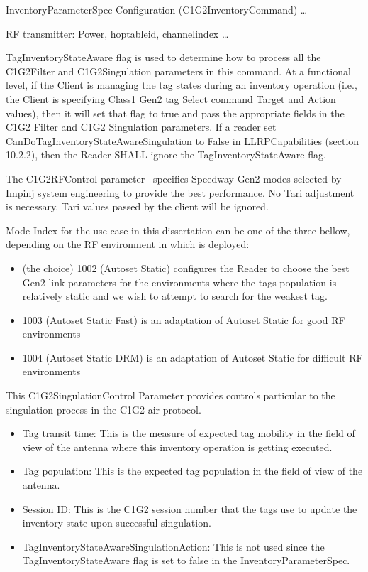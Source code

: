InventoryParameterSpec Configuration (C1G2InventoryCommand) \dots

RF transmitter: Power, hoptableid, channelindex \dots

TagInventoryStateAware flag is used to determine how to process all the C1G2Filter and C1G2Singulation parameters in this command. At a functional level, if the Client is managing the tag states during an inventory operation (i.e., the Client is specifying Class1 Gen2 tag Select command Target and Action values), then it will set that flag to true and pass the appropriate fields in the C1G2 Filter and C1G2 Singulation parameters. If a reader set CanDoTagInventoryStateAwareSingulation to False in LLRPCapabilities (section 10.2.2), then the Reader SHALL ignore the TagInventoryStateAware flag.

The C1G2RFControl parameter~\cite[sec. 3.1.4]{ImpinjOctaneLLRP} specifies Speedway Gen2 modes selected by Impinj system engineering to provide the best performance. No Tari adjustment is necessary. Tari values passed by the client will be ignored.

Mode Index for the use case in this dissertation can be one of the three bellow, depending on the RF environment in which is deployed: 

\begin{itemize}
    \item (the choice) 1002 (Autoset Static) configures the Reader to choose the best Gen2 link parameters for the environments where the tags population is relatively static and we wish to attempt to search for the weakest tag.
    \item 1003 (Autoset Static Fast) is an adaptation of Autoset Static for good RF environments
    \item 1004 (Autoset Static DRM) is an adaptation of Autoset Static for difficult RF environments
\end{itemize}

This C1G2SingulationControl Parameter provides controls particular to the singulation process in the C1G2 air protocol.

\begin{itemize}
    \item Tag transit time: This is the measure of expected tag mobility in the field of view of the antenna where this inventory operation is getting executed.
    \item Tag population: This is the expected tag population in the field of view of the antenna.
    \item Session ID: This is the C1G2 session number that the tags use to update the inventory state upon successful singulation.
    \item  TagInventoryStateAwareSingulationAction: This is not used since the TagInventoryStateAware flag is set to false in the InventoryParameterSpec.
\end{itemize}

